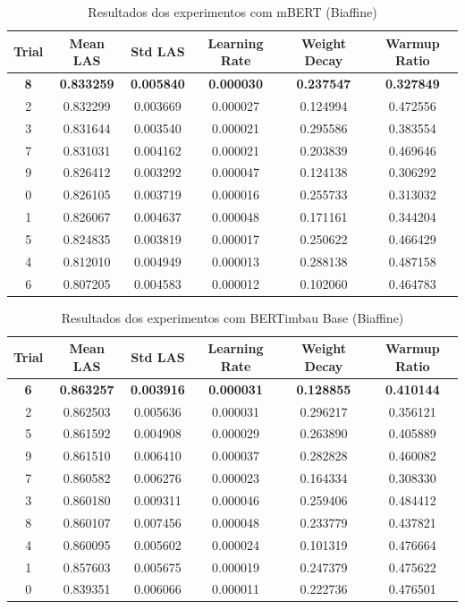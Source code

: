 
\begin{table}[ht]
\centering
\caption{Resultados dos experimentos com mBERT (Biaffine)}
\label{tab:mbert-biaffine-results}
\begin{tabular}{c c c c c c}
\hline
\textbf{Trial} & \textbf{Mean LAS} & \textbf{Std LAS} & \textbf{Learning Rate} & \textbf{Weight Decay} & \textbf{Warmup Ratio} \\
\hline
\textbf{8} & \textbf{0.833259} & \textbf{0.005840} &  \textbf{0.000030} & \textbf{0.237547} & \textbf{0.327849} \\
2 & 0.832299 & 0.003669 &  0.000027 & 0.124994 & 0.472556 \\
3 & 0.831644 & 0.003540 &  0.000021 & 0.295586 & 0.383554 \\
7 & 0.831031 & 0.004162 &  0.000021 & 0.203839 & 0.469646 \\
9 & 0.826412 & 0.003292 &  0.000047 & 0.124138 & 0.306292 \\
0 & 0.826105 & 0.003719 &  0.000016 & 0.255733 & 0.313032 \\
1 & 0.826067 & 0.004637 &  0.000048 & 0.171161 & 0.344204 \\
5 & 0.824835 & 0.003819 &  0.000017 & 0.250622 & 0.466429 \\
4 & 0.812010 & 0.004949 &  0.000013 & 0.288138 & 0.487158 \\
6 & 0.807205 & 0.004583 &  0.000012 & 0.102060 & 0.464783 \\
\hline
\end{tabular}
\end{table}


\begin{table}[ht]
\centering
\caption{Resultados dos experimentos com BERTimbau Base (Biaffine)}
\label{tab:bertimbau-large-results}
\begin{tabular}{c c c c c c}
\hline
\textbf{Trial} & \textbf{Mean LAS} & \textbf{Std LAS} & \textbf{Learning Rate} & \textbf{Weight Decay} & \textbf{Warmup Ratio} \\
\hline
\textbf{6} & \textbf{0.863257} & \textbf{0.003916} & \textbf{0.000031} & \textbf{0.128855} & \textbf{0.410144} \\
2 & 0.862503 & 0.005636 & 0.000031 & 0.296217 & 0.356121 \\
5 & 0.861592 & 0.004908 & 0.000029 & 0.263890 & 0.405889 \\
9 & 0.861510 & 0.006410 & 0.000037 & 0.282828 & 0.460082 \\
7 & 0.860582 & 0.006276 & 0.000023 & 0.164334 & 0.308330 \\
3 & 0.860180 & 0.009311 & 0.000046 & 0.259406 & 0.484412 \\
8 & 0.860107 & 0.007456 & 0.000048 & 0.233779 & 0.437821 \\
4 & 0.860095 & 0.005602 & 0.000024 & 0.101319 & 0.476664 \\
1 & 0.857603 & 0.005675 & 0.000019 & 0.247379 & 0.475622 \\
0 & 0.839351 & 0.006066 & 0.000011 & 0.222736 & 0.476501 \\
\hline
\end{tabular}
\end{table}

